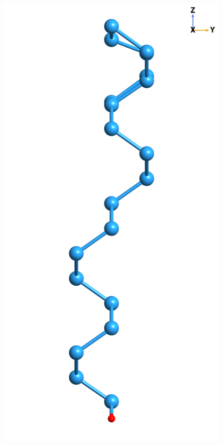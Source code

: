 {\begin{figure}
\begin{minipage}[b]{0.31\textwidth}
        \label{fig:2x1front}
    \end{minipage}
    \begin{minipage}[b]{0.31\textwidth}
        \centering
        \includegraphics[width=\textwidth]{figures/source/structure/Si2x1-side}

\end{minipage}
\end{figure}}
